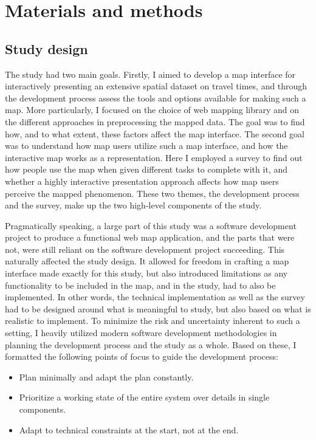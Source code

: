 \section{Materials and methods}

\subsection{Study design}

The study had two main goals.
Firstly, I aimed to develop a map interface for
interactively presenting an extensive spatial dataset on travel times,
and through the development process assess
the tools and options available for making such a map.
More particularly,
I focused on the choice of web mapping library
and on the different approaches in preprocessing the mapped data.
The goal was to find how,
and to what extent,
these factors affect the map interface.
The second goal was to understand how map users utilize such a map interface,
and how the interactive map works as a representation.
Here I employed a survey to find out how
people use the map when given different tasks to complete with it,
and whether a highly interactive presentation approach affects
how map users perceive the mapped phenomenon.
These two themes, the development process and the survey,
make up the two high-level components of the study.


Pragmatically speaking, a large part of this study was
a software development project to produce a functional web map application,
and the parts that were not, were still reliant on
the software development project succeeding.
This naturally affected the study design.
It allowed for freedom in crafting a map interface made exactly for this study,
but also introduced limitations
as any functionality to be included in the map, and in the study,
had to also be implemented.
In other words, the technical implementation as well as the survey
had to be designed around what is meaningful to study,
but also based on what is realistic to implement.
To minimize the risk and uncertainty inherent to such a setting,
I heavily utilized modern software development methodologies
\parencite{saq2020, bec2001, sha2017, kuh2017}
in planning the development process and the study as a whole.
Based on these,
I formatted the following points of focus
to guide the development process:
\begin{itemize}
	\item Plan minimally and adapt the plan constantly.
	\item Prioritize a working state of the entire system over details in single components.
	\item Adapt to technical constraints at the start, not at the end.
\end{itemize}

